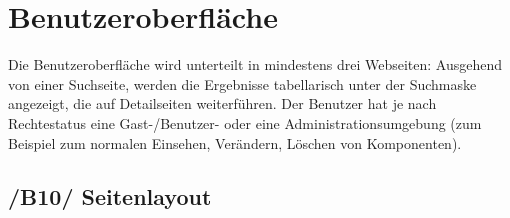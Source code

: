 

\chapter{Benutzeroberfläche}

Die Benutzeroberfläche wird unterteilt in mindestens drei Webseiten:
Ausgehend von einer Suchseite, werden die Ergebnisse tabellarisch unter der
Suchmaske angezeigt, die auf Detailseiten weiterführen. 
Der Benutzer hat je nach Rechtestatus eine Gast-/Benutzer- oder eine Administrationsumgebung (zum Beispiel zum normalen Einsehen, Verändern, Löschen von Komponenten). 

\section{/B10/ Seitenlayout}


